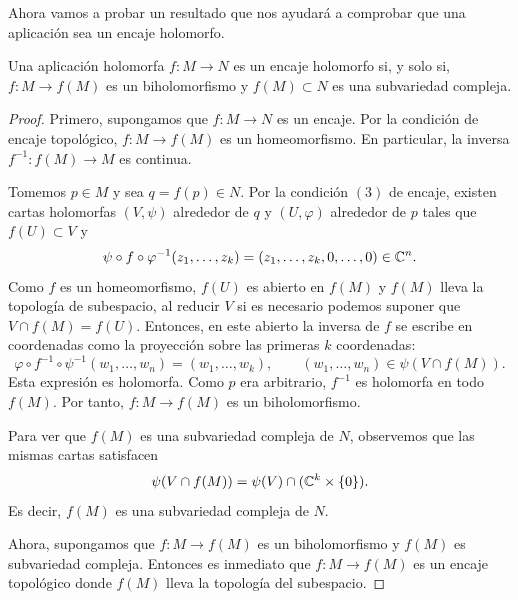    Ahora vamos a probar un resultado que nos ayudará a comprobar que una aplicación sea un encaje holomorfo. 
    
    \begin{propo}\label{encajesubvariedades}
    	Una aplicación holomorfa $f:M\to N$ es un encaje holomorfo si, y solo si, $f:M\to f(M)$ es un biholomorfismo y $f(M)\subset N$ es una subvariedad compleja.
    \end{propo}
    \begin{proof}
    		Primero, supongamos que $f:M\to N$ es un encaje. Por la condición de encaje topológico, $f:M\to f(M)$ es un homeomorfismo. En particular, la inversa $f^{-1}:f(M)\to M$ es continua.
    		
    		Tomemos $p\in M$ y sea $q=f(p)\in N$. Por la condición $(3)$ de encaje, existen cartas holomorfas $(V,\psi)$ alrededor de $q$ y $(U,\varphi)$ alrededor de $p$ tales que $f(U)\subset V$ y
    		\begin{equation*}
    			\psi\circ f\circ \varphi^{-1}(z_1,\dots,z_k)=(z_1,\dots,z_k,0,\dots,0)\in \mathbb{C}^n.
    		\end{equation*}
    		Como $f$ es un homeomorfismo, $f(U)$ es abierto en $f(M)$ y $f(M)$ lleva la topología de subespacio, al reducir $V$ si es necesario podemos suponer que $V\cap f(M)=f(U)$. Entonces, en este abierto la inversa de $f$ se escribe en coordenadas como la proyección sobre las primeras $k$ coordenadas:
    		\begin{equation*}
    			\varphi\circ f^{-1}\circ \psi^{-1}(w_1,\dots,w_n)=(w_1,\dots,w_k),
    			\qquad (w_1,\dots,w_n)\in \psi(V\cap f(M)).
    		\end{equation*}
    		Esta expresión es holomorfa. Como $p$ era arbitrario, $f^{-1}$ es holomorfa en todo $f(M)$. Por tanto, $f:M\to f(M)$ es un biholomorfismo.
    		
    		Para ver que $f(M)$ es una subvariedad compleja de $N$, observemos que las mismas cartas satisfacen
    		\begin{equation*}
    			\psi(V\cap f(M))=\psi(V)\cap (\mathbb{C}^k\times \{0\}).
    		\end{equation*}
  			Es decir, $f(M)$ es una subvariedad compleja de $N$.
  			
  			Ahora, supongamos que $f:M\to f(M)$ es un biholomorfismo y $f(M)$ es subvariedad compleja. Entonces es inmediato que $f:M\to f(M)$ es un encaje topológico donde $f(M)$ lleva la topología del subespacio. 
  			

\end{proof}
